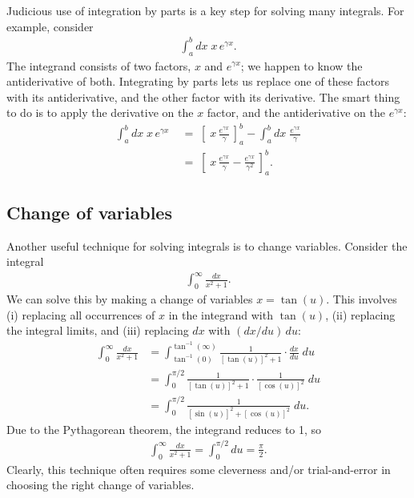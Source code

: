 \documentclass[10pt,a4paper]{article}
\begin{document}
Judicious use of integration by parts is a key step for solving many
integrals.  For example, consider
\begin{align}
  \int_a^b dx\; x \, e^{\gamma x}.
\end{align}
The integrand consists of two factors, $x$ and $e^{\gamma x}$; we
happen to know the antiderivative of both.  Integrating by parts lets
us replace one of these factors with its antiderivative, and the other
factor with its derivative.  The smart thing to do is to apply the
derivative on the $x$ factor, and the antiderivative on the $e^{\gamma
  x}$:
\begin{align}
  \int_a^b dx\; x\, e^{\gamma x} \;&=\; \left[\;x\, \frac{e^{\gamma x}}{\gamma}\, \right]_a^b - \int_a^b dx\; \frac{e^{\gamma x}}{\gamma} \\
  &=\; \left[\;x\, \frac{e^{\gamma x}}{\gamma} - \frac{e^{\gamma x}}{\gamma^2} \,\right]_a^b.
\end{align}

\subsection{Change of variables}
\label{change-of-variables}

Another useful technique for solving integrals is to change variables.
Consider the integral
\begin{align}
  \int_0^\infty \frac{dx}{x^2 + 1}.
\end{align}
We can solve this by making a change of variables $x = \tan(u)$.  This
involves (i) replacing all occurrences of $x$ in the integrand with
$\tan(u)$, (ii) replacing the integral limits, and (iii) replacing
$dx$ with $(dx/du) \, du$:
\begin{align}
  \int_0^\infty \frac{dx}{x^2 + 1} &= \int_{\tan^{-1}(0)}^{\tan^{-1}(\infty)} \frac{1}{[\tan(u)]^2 + 1} \cdot \frac{dx}{du} \; du \\
  &= \int_0^{\pi/2} \frac{1}{[\tan(u)]^2 + 1} \cdot \frac{1}{[\cos(u)]^2} \; du \\
  &= \int_0^{\pi/2} \frac{1}{[\sin(u)]^2 + [\cos(u)]^2} \; du.
\end{align}
Due to the Pythagorean theorem, the integrand reduces to 1, so
\begin{align}
  \int_0^\infty \frac{dx}{x^2 + 1} = \int_0^{\pi/2} du = \frac{\pi}{2}.
\end{align}
Clearly, this technique often requires some cleverness and/or
trial-and-error in choosing the right change of variables.
\end{document}
